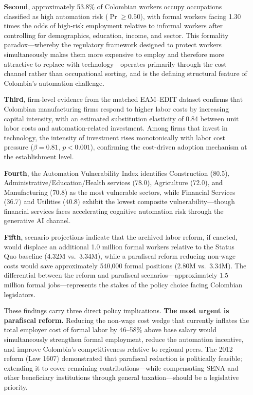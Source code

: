 \documentclass{article}
\begin{document}
\textbf{Second}, approximately 53.8\% of Colombian workers occupy occupations classified as high automation risk ($\Pr \geq 0.50$), with formal workers facing 1.30 times the odds of high-risk employment relative to informal workers after controlling for demographics, education, income, and sector. This formality paradox---whereby the regulatory framework designed to protect workers simultaneously makes them more expensive to employ and therefore more attractive to replace with technology---operates primarily through the cost channel rather than occupational sorting, and is the defining structural feature of Colombia's automation challenge.

\textbf{Third}, firm-level evidence from the matched EAM--EDIT dataset confirms that Colombian manufacturing firms respond to higher labor costs by increasing capital intensity, with an estimated substitution elasticity of 0.84 between unit labor costs and automation-related investment. Among firms that invest in technology, the intensity of investment rises monotonically with labor cost pressure ($\beta = 0.81$, $p < 0.001$), confirming the cost-driven adoption mechanism at the establishment level.

\textbf{Fourth}, the Automation Vulnerability Index identifies Construction (80.5), Administrative/Education/Health services (78.0), Agriculture (72.0), and Manufacturing (70.8) as the most vulnerable sectors, while Financial Services (36.7) and Utilities (40.8) exhibit the lowest composite vulnerability---though financial services faces accelerating cognitive automation risk through the generative AI channel.

\textbf{Fifth}, scenario projections indicate that the archived labor reform, if enacted, would displace an additional 1.0 million formal workers relative to the Status Quo baseline (4.32M vs.\ 3.34M), while a parafiscal reform reducing non-wage costs would save approximately 540,000 formal positions (2.80M vs.\ 3.34M). The differential between the reform and parafiscal scenarios---approximately 1.5 million formal jobs---represents the stakes of the policy choice facing Colombian legislators.

These findings carry three direct policy implications. \textbf{The most urgent is parafiscal reform.} Reducing the non-wage cost wedge that currently inflates the total employer cost of formal labor by 46--58\% above base salary would simultaneously strengthen formal employment, reduce the automation incentive, and improve Colombia's competitiveness relative to regional peers. The 2012 reform (Law 1607) demonstrated that parafiscal reduction is politically feasible; extending it to cover remaining contributions---while compensating SENA and other beneficiary institutions through general taxation---should be a legislative priority.
\end{document}
